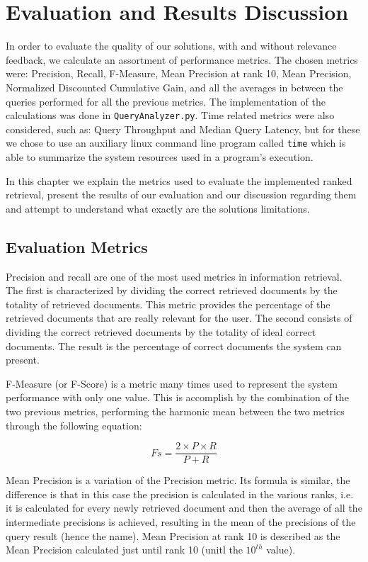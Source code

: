 \documentclass[12pt]{article}
\begin{document}
\newpage
\section{Evaluation and Results Discussion}

In order to evaluate the quality of our solutions, with and without relevance 
feedback, we calculate an assortment of performance metrics.
The chosen metrics were: Precision, Recall, F-Measure, Mean Precision at rank 10, 
Mean Precision, Normalized Discounted Cumulative Gain, and all the averages in 
between the queries performed for all the previous metrics.
The implementation of the calculations was done in \texttt{QueryAnalyzer.py}.
Time related metrics were also considered, such as: Query Throughput and Median 
Query Latency, but for these we chose to use an auxiliary linux command line 
program called \texttt{time} which is able to summarize the system resources 
used in a program's execution.

In this chapter we explain the metrics used to evaluate the implemented ranked
retrieval, present the results of our evaluation and our discussion regarding 
them and attempt to understand what exactly are the solutions limitations.

\subsection{Evaluation Metrics}

Precision and recall are one of the most used metrics in information retrieval.
The first is characterized by dividing the correct retrieved documents by the 
totality of retrieved documents. 
This metric provides the percentage of the retrieved documents that are really 
relevant for the user.
The second consists of dividing the correct retrieved documents by the totality 
of ideal correct documents. 
The result is the percentage of correct documents the system can present.

F-Measure (or F-Score) is a metric many times used to represent the system 
performance with only one value. 
This is accomplish by the combination of the two previous metrics, performing 
the harmonic mean between the two metrics through the following equation:

\begin{equation}
  Fs = \frac{2 \times P \times R}{P + R}
\end{equation}

Mean Precision is a variation of the Precision metric. 
Its formula is similar, the difference is that in this case the precision 
is calculated in the various ranks, i.e. it is calculated for every newly 
retrieved document and then the average of all the intermediate precisions 
is achieved, resulting in the mean of the precisions of the query result
(hence the name).
Mean Precision at rank 10 is described as the Mean Precision calculated just 
until rank 10 (unitl the $10^{th}$ value).
\end{document}
